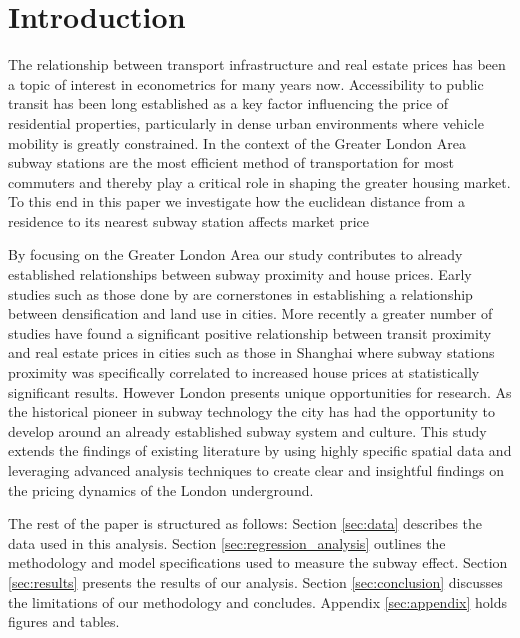 \section{Introduction}
The relationship between transport infrastructure and real estate prices has been a topic of interest in econometrics for many years now. Accessibility to public transit has been long established as a key factor influencing the price of residential properties, particularly in dense urban environments where vehicle mobility is greatly constrained.
 In the context of the Greater London Area subway stations are the most efficient method of transportation for most commuters and thereby play a critical role in shaping the greater housing market.
  To this end in this paper we investigate how the euclidean distance from a residence to its nearest subway station affects market price 

By focusing on the Greater London Area our study contributes to already established relationships between subway proximity and house prices. 
Early studies such as those done by \citet{muth_1969} are cornerstones in establishing a relationship between densification and land use in cities. 
More recently a greater number of studies have found a significant positive relationship between transit proximity and real estate prices 
in cities such as those in Shanghai \citep{zhou_2019} where subway stations proximity was specifically correlated to 
increased house prices at statistically significant results. 
However London presents unique opportunities for research. 
As the historical pioneer in subway technology the city has had 
the opportunity to develop around an already established subway system and culture. 
This study extends the findings of existing literature by using highly specific spatial data and 
leveraging advanced analysis techniques to create clear and insightful findings on the pricing dynamics of the London underground.


The rest of the paper is structured as follows: Section \ref{sec:data} describes the data used in this analysis. Section \ref{sec:regression_analysis} outlines the methodology and model specifications used to measure the subway effect.
Section \ref{sec:results} presents the results of our analysis. Section \ref{sec:conclusion} discusses the limitations of our methodology and concludes. Appendix \ref{sec:appendix} holds figures and tables.
